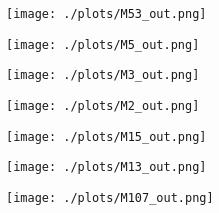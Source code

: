 \documentclass[12pt, preprint]{aastex}
\begin{document}
\begin{figure}[h!]
  \texttt{[image: ./plots/M53\_out.png]}
    \end{figure}
\begin{figure}[h!]

  \texttt{[image: ./plots/M5\_out.png]}
    \end{figure}
\begin{figure}
  \texttt{[image: ./plots/M3\_out.png]}  
  \end{figure}
\begin{figure}

  \texttt{[image: ./plots/M2\_out.png]}
    \end{figure}
\begin{figure}

  \texttt{[image: ./plots/M15\_out.png]}
    \end{figure}
\begin{figure}

  \texttt{[image: ./plots/M13\_out.png]}
     \end{figure}
  \begin{figure}
  \texttt{[image: ./plots/M107\_out.png]}
   \end{figure}
\end{document}
